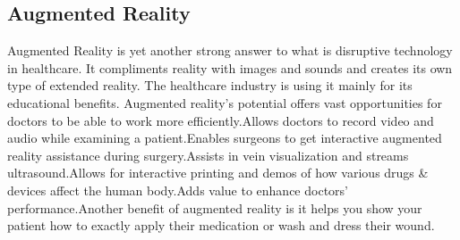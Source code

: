 \documentclass{article}
\begin{document}
\subsection{Augmented Reality
}
Augmented Reality is yet another strong answer to what is disruptive technology in healthcare. It compliments reality with images and sounds and creates its own type of extended reality. The healthcare industry is using it mainly for its educational benefits.  Augmented reality’s potential offers vast opportunities for doctors to be able to work more efficiently.Allows doctors to record video and audio while examining a patient.Enables surgeons to get interactive augmented reality assistance during surgery.Assists in vein visualization and streams ultrasound.Allows for interactive printing and demos of how various drugs & devices affect the human body.Adds value to enhance doctors’ performance.Another benefit of augmented reality is it helps you show your patient how to exactly apply their medication or wash and dress their wound.
\end{document}
